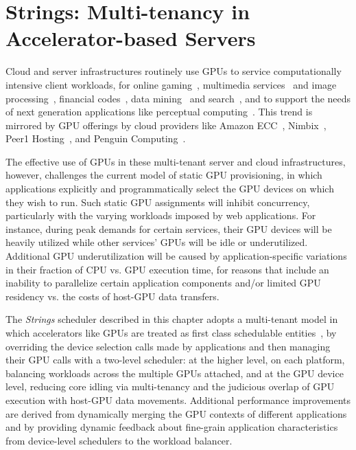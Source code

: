 \chapter{Strings: Multi-tenancy in Accelerator-based Servers}

Cloud and server infrastructures routinely use GPUs to service computationally intensive client workloads, for online gaming~\cite{nvidia-game}, multimedia services~\cite{element} and image processing~\cite{adobe}, financial codes~\cite{zillians}, data mining~\cite{GPUmine} and search~\cite{GPUsearch}, and to support the needs of next generation applications like perceptual computing~\cite{GPU29, GPU30, GPU31, GPU32, GPU33}. This trend is mirrored by GPU offerings by cloud providers like Amazon ECC~\cite{amazon}, Nimbix~\cite{nimbix}, Peer1 Hosting~\cite{peer1}, and Penguin Computing~\cite{penguin}. 

The effective use of GPUs in these multi-tenant server and cloud infrastructures, however, challenges the current model of static GPU provisioning, in which applications explicitly and programmatically select the GPU devices on which they wish to run. Such static GPU assignments will inhibit concurrency, particularly with the varying workloads imposed by web applications. For instance, during peak demands for certain services, their GPU devices will be heavily utilized while other services' GPUs will be idle or underutilized. Additional GPU underutilization will be caused by application-specific variations in their fraction of CPU vs. GPU execution time, for reasons that include an inability to parallelize certain application components and/or limited GPU residency vs. the costs of host-GPU data transfers.

The \textit{Strings} scheduler described in this chapter adopts a multi-tenant model in which accelerators like GPUs are treated as first class schedulable entities~\cite{gdev, gvim, ravi, pegasus}, by overriding the device selection calls made by applications and then managing their GPU calls with a two-level scheduler: at the higher level, on each platform, balancing workloads across the multiple GPUs attached, and at the GPU device level, reducing core idling via multi-tenancy and the judicious overlap of GPU execution with host-GPU data movements. Additional performance improvements are derived from dynamically merging the GPU contexts of different applications and by providing dynamic feedback about fine-grain application characteristics from device-level schedulers to the workload balancer.

